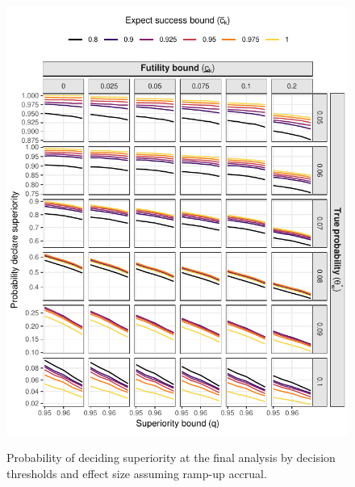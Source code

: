 \documentclass{article}
\begin{document}
\begin{figure}[!ht]
	\caption{Probability of deciding superiority at the final analysis by decision thresholds and effect size assuming ramp-up accrual.}
	\includegraphics{superiority_5.pdf}
	\label{fig:superiority_rampup}
\end{figure}
\end{document}
